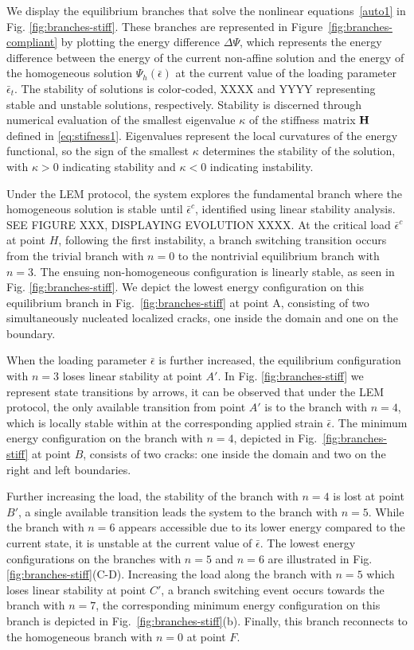We display the equilibrium branches that solve the nonlinear equations~\ref{auto1} in Fig. \ref{fig:branches-stiff}. These branches are represented in Figure~\ref{fig:branches-compliant} by plotting the energy difference $\Delta \Psi$, which represents the energy difference between the energy of the current non-affine solution and the energy of the homogeneous solution $\Psi_h(\bar{\epsilon})$ at the current value of the loading parameter $\bar\epsilon_t$. The stability of solutions is color-coded, XXXX and YYYY representing stable and unstable solutions, respectively. Stability is discerned through numerical evaluation of the smallest eigenvalue $\kappa$ of the stiffness matrix $\mathbf{H}$ defined in \eqref{eq:stifness1}. Eigenvalues represent the local curvatures of the energy functional, so the sign of the smallest  $\kappa$ determines the stability of the solution, with $\kappa > 0$ indicating stability and $\kappa < 0$ indicating instability.

Under the LEM protocol, the system explores the fundamental branch where the homogeneous solution is stable until $\bar\epsilon^c$, identified using linear stability analysis. SEE FIGURE XXX, DISPLAYING EVOLUTION XXXX. At the critical load $\bar\epsilon^c$  at point $H$, following the first instability, a branch switching transition occurs from the trivial branch with $n = 0$ to the nontrivial equilibrium branch with $n = 3$. The ensuing non-homogeneous configuration is linearly stable, as seen in Fig. \ref{fig:branches-stiff}. We depict the lowest energy configuration on this equilibrium branch in Fig.~\ref{fig:branches-stiff} at point A, consisting of two simultaneously nucleated localized cracks, one inside the domain and one on the boundary. 

When the loading parameter $\bar{\epsilon}$ is further increased, the equilibrium configuration with $n=3$ loses linear stability at point $A'$. In Fig. \ref{fig:branches-stiff} we represent state transitions by arrows, it can be observed that under the LEM protocol, the only available transition from point $A'$ is to the branch with $n=4$, which is locally stable within at the corresponding applied strain $\bar{\epsilon}$. The minimum energy configuration on the branch with $n=4$, depicted in Fig.~\ref{fig:branches-stiff} at point $B$, consists of two cracks: one inside the domain and two on the right and left boundaries.

Further increasing the load, the stability of the branch with $n=4$ is lost at point $B'$, a single available transition leads the system to the branch with $n=5$. While the branch with $n=6$ appears accessible due to its lower energy compared to the current state, it is unstable at the current value of $\bar\epsilon$. The lowest energy configurations on the branches with $n=5$ and $n=6$ are illustrated in Fig. \ref{fig:branches-stiff}(C-D). Increasing the load along the branch with $n=5$ which loses linear stability at point $C'$, a branch switching event occurs towards the branch with $n=7$, the corresponding minimum energy configuration on this branch is depicted in Fig.~\ref{fig:branches-stiff}(b). Finally, this branch reconnects to the homogeneous branch with $n=0$ at point $F$.

